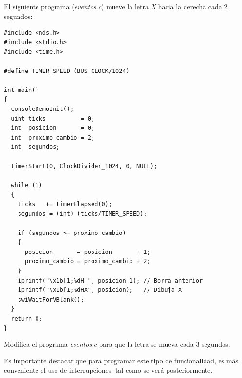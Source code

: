 \begin{example}
El siguiente programa (\textit{eventos.c}) mueve la letra \textit{X} hacia la derecha cada 2 segundos:

\begin{lstlisting}
#include <nds.h>
#include <stdio.h>
#include <time.h>

#define TIMER_SPEED (BUS_CLOCK/1024)

int main()
{
  consoleDemoInit();
  uint ticks          = 0;
  int  posicion       = 0;
  int  proximo_cambio = 2;
  int  segundos;
  
  timerStart(0, ClockDivider_1024, 0, NULL);

  while (1)
  {
    ticks   += timerElapsed(0);
    segundos = (int) (ticks/TIMER_SPEED);

    if (segundos >= proximo_cambio)
    {
      posicion       = posicion       + 1;
      proximo_cambio = proximo_cambio + 2;
    }
    iprintf("\x1b[1;%dH ", posicion-1); // Borra anterior
    iprintf("\x1b[1;%dHX", posicion);   // Dibuja X
    swiWaitForVBlank();
  }
  return 0;
}
\end{lstlisting}
\end{example}
	
\begin{exercise}
	Modifica el programa \textit{eventos.c} para que la letra se mueva cada 3 segundos.
\end{exercise}

Es importante destacar que para programar este tipo de funcionalidad, es más conveniente el uso de interrupciones, tal como se verá posteriormente.

